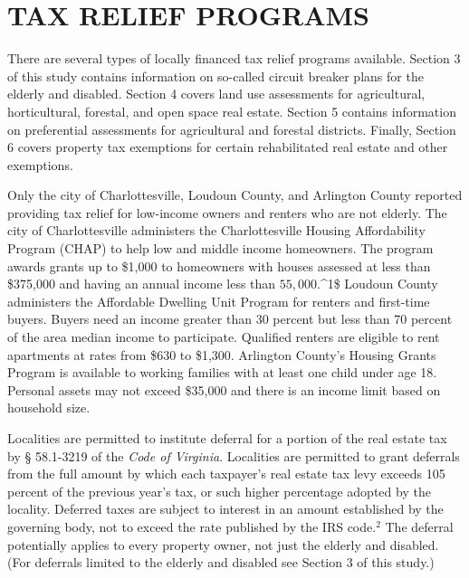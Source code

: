 \documentclass[
]{book}
\begin{document}
\hypertarget{tax-relief-programs}{%
\section{TAX RELIEF PROGRAMS}\label{tax-relief-programs}}

There are several types of locally financed tax relief programs available. Section 3 of this study contains information on so-called circuit breaker plans for the elderly and disabled. Section 4 covers land use assessments for agricultural, horticultural, forestal, and open space real estate. Section 5 contains information on preferential assessments for
agricultural and forestal districts. Finally, Section 6 covers property tax exemptions for certain rehabilitated real estate and other exemptions.

Only the city of Charlottesville, Loudoun County, and Arlington County reported providing tax relief for low-income
owners and renters who are not elderly. The city of Charlottesville administers the Charlottesville Housing Affordability Program (CHAP) to help low and middle income homeowners. The program awards grants up to \$1,000 to homeowners with houses assessed at less than \$375,000 and having an annual income less than \(55,000.\)\^{}1\$ Loudoun County administers the Affordable Dwelling Unit Program for renters and first-time buyers. Buyers need an income greater than 30 percent but less than 70 percent of the area median income to participate. Qualified renters are eligible to rent apartments at rates from \$630 to \$1,300. Arlington County's Housing Grants Program is available to working families with at least one child under age 18. Personal assets may not exceed \$35,000 and there is an income limit based on household size.

Localities are permitted to institute deferral for a portion of the real estate tax by § 58.1-3219 of the \emph{Code of Virginia}. Localities are permitted to grant deferrals from the full amount by which each taxpayer's real estate tax levy exceeds 105 percent of the previous year's tax, or such higher percentage adopted by the locality. Deferred taxes are subject to interest in an amount established by the governing body, not to exceed the rate published by the IRS code.\(^2\) The deferral potentially applies to every property owner, not just the elderly and disabled. (For deferrals limited to the elderly and disabled see Section 3 of this study.)
\end{document}
